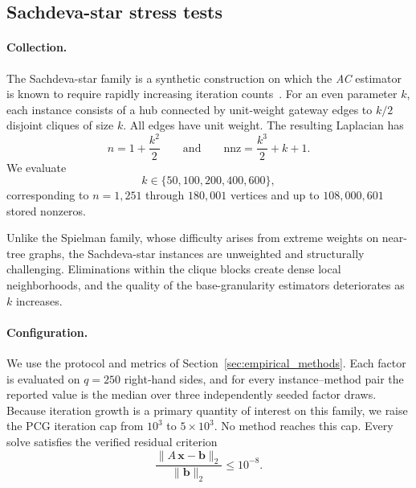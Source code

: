 \documentclass{article}
\newcommand{\AC}{\textit{AC}\xspace}
\newcommand{\1}{\mathbbm{1}}
\theoremstyle{plain}
\begin{document}

 







\subsection{Sachdeva-star stress tests}
\label{sec:sachdeva}
\paragraph{Collection.}
The Sachdeva-star family is a synthetic construction on which the \AC{} estimator is known to require rapidly increasing iteration counts~\cite{AC}. For an even parameter $k$, each instance consists of a hub connected by unit-weight gateway edges to $k/2$ disjoint cliques of size $k$. All edges have unit weight. The resulting Laplacian has
\[
n = 1+\frac{k^{2}}{2}
\qquad\text{and}\qquad
\mathrm{nnz} = \frac{k^{3}}{2}+k+1.
\]
We evaluate
\[
k\in\{50,100,200,400,600\},
\]
corresponding to $n=1{,}251$ through $180{,}001$ vertices and up to $108{,}000{,}601$ stored non\-zeros.


Unlike the Spielman family, whose difficulty arises from extreme weights on near-tree graphs, the Sachdeva-star instances are unweighted and structurally challenging. Eliminations within the clique blocks create dense local neighborhoods, and the quality of the base-granularity estimators deteriorates as $k$ increases. 

\paragraph{Configuration.}
We use the protocol and metrics of Section~\ref{sec:empirical_methods}. Each factor is evaluated on $q=250$ right-hand sides, and for every instance--method pair the reported value is the median over three independently seeded factor draws. Because iteration growth is a primary quantity of interest on this family, we raise the PCG iteration cap from $10^{3}$ to $5\times10^{3}$. No method reaches this cap.  Every solve satisfies the verified residual criterion
\[
\frac{\lVert A\,\mathbf{x}-\mathbf{b}\rVert_{2}}
{\lVert\mathbf{b}\rVert_{2}}
\leq 10^{-8}.
\]
\end{document}
